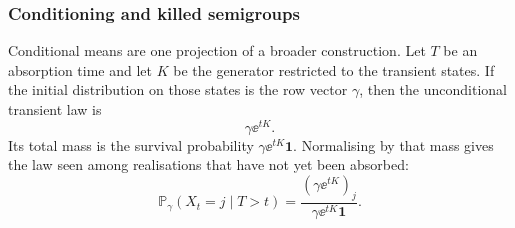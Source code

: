 \subsubsection{Conditioning and killed semigroups}
\label{m:sec:conditioning-killed-semigroups}

Conditional means are one projection of a broader construction.  Let $T$ be an
absorption time and let $K$ be the generator restricted to the transient states.
If the initial distribution on those states is the row vector $\gamma$, then the
unconditional transient law is
\begin{equation}
  \gamma\ee^{tK}.
  \label{m:eq:killed-semigroup-law}
\end{equation}
Its total mass is the survival probability
$\gamma\ee^{tK}\mathbf 1$.  Normalising by that mass gives the law seen among
realisations that have not yet been absorbed:
\begin{equation}
  \mathbb P_\gamma(X_t=j\mid T>t)
  =\frac{(\gamma\ee^{tK})_j}
         {\gamma\ee^{tK}\mathbf 1}.
  \label{m:eq:conditioned-killed-law}
\end{equation}
